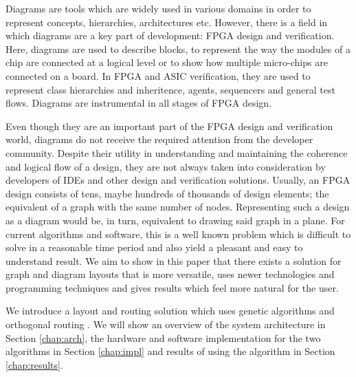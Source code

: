Diagrams are tools which are widely used in various domains in order to represent
concepts, hierarchies, architectures etc. However, there is a field in 
which diagrams are a key part of development: FPGA design and verification. Here, diagrams are used
to describe blocks, to represent the way the modules of a chip are connected at a 
logical level or to show how multiple micro-chips are connected on a board. In FPGA 
and ASIC verification, they are used to represent class hierarchies and inheritence, 
agents, sequencers and general test flows. Diagrams are instrumental in all
stages of FPGA design.

Even though they are an important part of the FPGA design and verification world, 
diagrams do not receive the required attention from the developer community. Despite 
their utility in understanding and maintaining the coherence and logical flow of a
design, they are not always taken into consideration by developers of IDEs and other 
design and verification solutions. Usually, an FPGA design consists of tens, maybe hundreds 
of thousands of design elements; the equivalent of a graph with the same number of nodes. 
Representing such a design as a diagram would be, in turn, equivalent to drawing said graph 
in a plane. For current algorithms and software, this is a well known problem which is 
difficult to solve in a reasonable time period and also yield a pleasant and easy to 
understand result. We aim to show in this paper that there exists a solution for graph 
and diagram layouts that is more versatile, uses newer technologies and programming 
techniques and gives results which feel more natural for the user.

We introduce a layout and routing solution which uses genetic algorithms and orthogonal
routing \cite{wybrow2010orthogonal}. We will show an overview of the system architecture in Section \ref{chap:arch}, 
the hardware and software implementation for the two algorithms in Section \ref{chap:impl} 
and results of using the algorithm in Section \ref{chap:results}.
